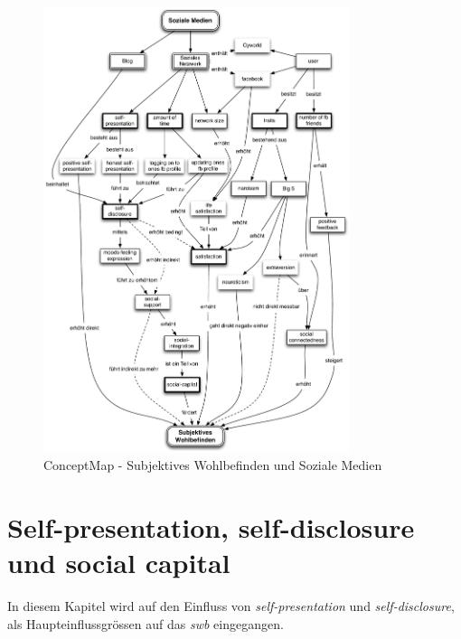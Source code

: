 \begin{figure}[H]
	\centering
		\includegraphics[width=0.8\textwidth]{images/grafiken/conceptMap_Swb_Sm_v2.pdf}
	\caption{ConceptMap - Subjektives Wohlbefinden und Soziale Medien}
	\label{fig.ConceptMapSwbSm}
\end{figure}

\section{Self-presentation, self-disclosure und social capital}\label{sub.selfp}
In diesem Kapitel wird auf den Einfluss von \textit{self-presentation} und \textit{self-disclosure}, als Haupteinflussgrössen auf das \textit{\gls{swb}} eingegangen. \newline

